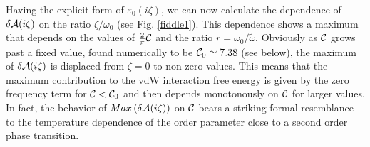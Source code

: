 \documentclass[letterpaper,twocolumn,amsmath,amssymb,floatfix,aps,superscriptaddress]{revtex4}
\begin{document}



Having the explicit form of $\varepsilon_0 (i \zeta)$, we can now calculate the dependence of $\delta{\cal A}(i\zeta)$ on the ratio $\zeta/\omega_0$ (see Fig. \ref{fiddle1}). This dependence shows a maximum that depends on the values of $ {\frac{2}{\pi} {\cal C}}$ and the ratio $r = \omega_0/\tilde\omega$. Obviously as ${\cal C}$ grows past a fixed value, found numerically to be ${\cal C}_0 \simeq 7.38$ (see below), the maximum of $\delta{\cal A}(i\zeta)$ is displaced from $\zeta = 0$ to non-zero values. This means that the maximum contribution to the vdW interaction free energy is given by the zero frequency term for  ${\cal C} < {\cal C}_0$ and then depends monotonously on ${\cal C}$ for larger values. In fact, the behavior of $Max\left(\delta{\cal A}(i\zeta)\right)$ on ${\cal C}$ bears a striking formal resemblance to the temperature dependence of the order parameter close to a second order phase transition. 
\end{document}
